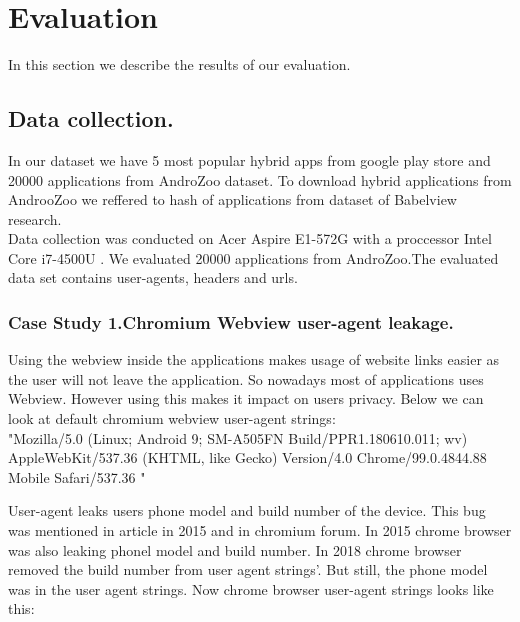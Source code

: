 \usepackage{multirow}
\usepackage{ragged2e}
\section{Evaluation}
In this section we describe the results of our evaluation.

\subsection{Data collection.}
In our dataset we have 5 most popular hybrid apps from google play store and 20000 applications from AndroZoo dataset\cite{allix2016androzoo}. To download hybrid applications from AndrooZoo we reffered to hash of applications from dataset of Babelview  research\cite{rizzo2018babelview}.\\
Data collection was conducted on Acer Aspire E1-572G with a proccessor Intel Core i7-4500U . We evaluated 20000 applications from AndroZoo.The evaluated data set contains user-agents, headers and urls.

\par
\subsubsection{Case Study 1.Chromium Webview user-agent leakage.}\par

 Using the webview inside the applications makes usage of website links easier as the user will not leave the application. So nowadays most of applications uses  Webview. However using this makes it impact on users privacy. Below we can look at default chromium webview user-agent strings:\\
 
         "Mozilla/5.0 (Linux; Android 9; SM-A505FN Build/PPR1.180610.011; wv)                     AppleWebKit/537.36 (KHTML, like Gecko) Version/4.0  Chrome/99.0.4844.88              Mobile Safari/537.36 "         \\
         \par

User-agent leaks users phone model and build number of the device. This bug was mentioned in article in 2015\cite{nightwatch} and in chromium forum\cite{forum}. In 2015 chrome browser was also leaking phonel model and build number. In 2018 chrome browser removed the build number from user agent strings'\cite{nightwatch1}. But still, the phone model was in the user agent strings. Now chrome browser user-agent strings looks like this:\\

